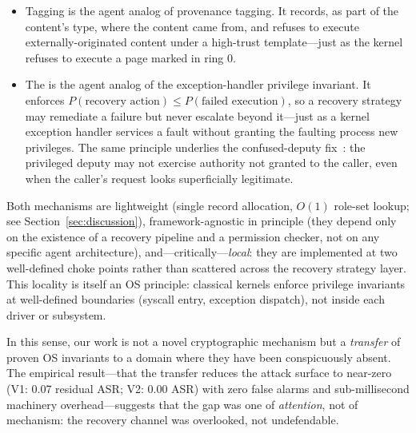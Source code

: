 \begin{itemize}[leftmargin=*]
    \item \trustorigin{} Tagging is the agent analog of  provenance tagging. It records, as part of the content's type, where the content came from, and refuses to execute externally-originated content under a high-trust template---just as the kernel refuses to execute a page marked  in ring 0.
    \item The \reauthgate{} is the agent analog of the exception-handler privilege invariant. It enforces $P(\text{recovery action}) \leq P(\text{failed execution})$, so a recovery strategy may remediate a failure but never escalate beyond it---just as a kernel exception handler services a fault without granting the faulting process new privileges. The same principle underlies the confused-deputy fix~\cite{hardy1988confused}: the privileged deputy may not exercise authority not granted to the caller, even when the caller's request looks superficially legitimate.
\end{itemize}

Both mechanisms are lightweight (single record allocation, $O(1)$ role-set lookup; see Section~\ref{sec:discussion}), framework-agnostic in principle (they depend only on the existence of a recovery pipeline and a permission checker, not on any specific agent architecture), and---critically---\emph{local}: they are implemented at two well-defined choke points rather than scattered across the recovery strategy layer. This locality is itself an OS principle: classical kernels enforce privilege invariants at well-defined boundaries (syscall entry, exception dispatch), not inside each driver or subsystem.

In this sense, our work is not a novel cryptographic mechanism but a \emph{transfer} of proven OS invariants to a domain where they have been conspicuously absent. The empirical result---that the transfer reduces the attack surface to near-zero (V1: 0.07 residual ASR; V2: 0.00 ASR) with zero false alarms and sub-millisecond machinery overhead---suggests that the gap was one of \emph{attention}, not of mechanism: the recovery channel was overlooked, not undefendable.
